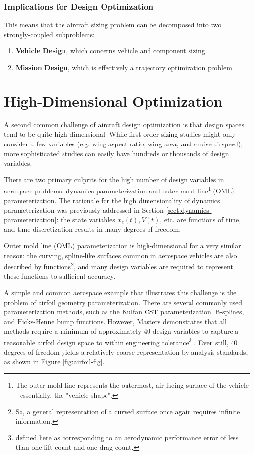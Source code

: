 \subsubsection{Implications for Design Optimization}

This means that the aircraft sizing problem can be decomposed into two strongly-coupled subproblems:

\begin{enumerate}
    \item \textbf{Vehicle Design}, which concerns vehicle and component sizing.
    \item \textbf{Mission Design}, which is effectively a trajectory optimization problem.
\end{enumerate}



\section{High-Dimensional Optimization}
\label{sect:high-dim-opt}

A second common challenge of aircraft design optimization is that design spaces tend to be quite high-dimensional. While first-order sizing studies might only consider a few variables (e.g. wing aspect ratio, wing area, and cruise airspeed), more sophisticated studies can easily have hundreds or thousands of design variables.

There are two primary culprits for the high number of design variables in aerospace problems: dynamics parameterization and outer mold line\footnote{The outer mold line represents the outermost, air-facing surface of the vehicle - essentially, the "vehicle shape".} (OML) parameterization. The rationale for the high dimensionality of dynamics parameterization was previously addressed in Section \ref{sect:dynamics-parameterization}: the state variables $x_e(t), V(t)$, etc. are functions of time, and time discretization results in many degrees of freedom.

Outer mold line (OML) parameterization is high-dimensional for a very similar reason: the curving, spline-like surfaces common in aerospace vehicles are also described by functions\footnote{So, a general representation of a curved surface once again requires infinite information.}, and many design variables are required to represent these functions to sufficient accuracy.

A simple and common aerospace example that illustrates this challenge is the problem of airfoil geometry parameterization. There are several commonly used parameterization methods, such as the Kulfan CST parameterization, B-splines, and Hicks-Henne bump functions. However, Masters demonstrates that all methods require a minimum of approximately 40 design variables to capture a reasonable airfoil design space to within engineering tolerance\footnote{defined here as corresponding to an aerodynamic performance error of less than one lift count and one drag count.} \cite{masters2017}. Even still, 40 degrees of freedom yields a relatively coarse representation by analysis standards, as shown in Figure \ref{fig:airfoil-fig}.


